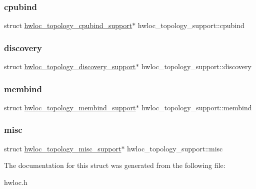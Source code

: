 \subsubsection{\texorpdfstring{cpubind}{cpubind}}
{\footnotesize\ttfamily struct \hyperlink{a00294}{hwloc\+\_\+topology\+\_\+cpubind\+\_\+support}$\ast$ hwloc\+\_\+topology\+\_\+support\+::cpubind}

\mbox{\label{a00306_aea3fbd7653d987d81f848636c420504d}} 
\subsubsection{\texorpdfstring{discovery}{discovery}}
{\footnotesize\ttfamily struct \hyperlink{a00290}{hwloc\+\_\+topology\+\_\+discovery\+\_\+support}$\ast$ hwloc\+\_\+topology\+\_\+support\+::discovery}

\mbox{\label{a00306_ac6eb62ae8bc0a68dce679a7107a36194}} 
\subsubsection{\texorpdfstring{membind}{membind}}
{\footnotesize\ttfamily struct \hyperlink{a00298}{hwloc\+\_\+topology\+\_\+membind\+\_\+support}$\ast$ hwloc\+\_\+topology\+\_\+support\+::membind}

\mbox{\label{a00306_ab9d08df4b0b03994f21b893ece826e78}} 
\subsubsection{\texorpdfstring{misc}{misc}}
{\footnotesize\ttfamily struct \hyperlink{a00302}{hwloc\+\_\+topology\+\_\+misc\+\_\+support}$\ast$ hwloc\+\_\+topology\+\_\+support\+::misc}



The documentation for this struct was generated from the following file\+:\begin{DoxyCompactItemize}
\item 
hwloc.\+h\end{DoxyCompactItemize}
